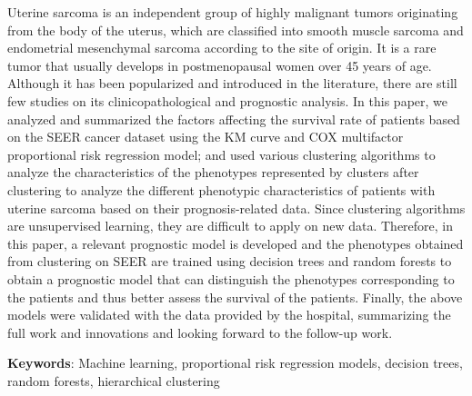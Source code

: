 Uterine sarcoma is an independent group of highly malignant tumors originating from the body of the uterus, which are classified into smooth muscle sarcoma and endometrial mesenchymal sarcoma according to the site of origin. It is a rare tumor that usually develops in postmenopausal women over 45 years of age. Although it has been popularized and introduced in the literature, there are still few studies on its clinicopathological and prognostic analysis. In this paper, we analyzed and summarized the factors affecting the survival rate of patients based on the SEER cancer dataset using the KM curve and COX multifactor proportional risk regression model; and used various clustering algorithms to analyze the characteristics of the phenotypes represented by clusters after clustering to analyze the different phenotypic characteristics of patients with uterine sarcoma based on their prognosis-related data. Since clustering algorithms are unsupervised learning, they are difficult to apply on new data. Therefore, in this paper, a relevant prognostic model is developed and the phenotypes obtained from clustering on SEER are trained using decision trees and random forests to obtain a prognostic model that can distinguish the phenotypes corresponding to the patients and thus better assess the survival of the patients. Finally, the above models were validated with the data provided by the hospital, summarizing the full work and innovations and looking forward to the follow-up work.

\vspace{8mm}

\textbf{Keywords}: Machine learning, proportional risk regression models, decision trees, random forests, hierarchical clustering